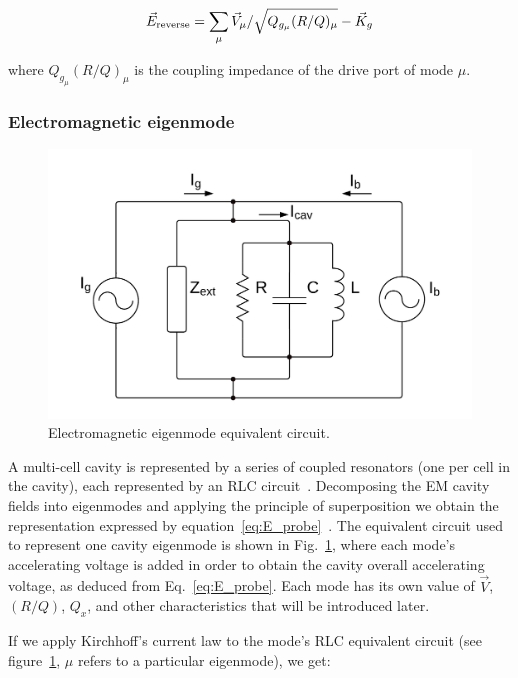 \documentclass[a4paper,12pt]{article}
\begin{document}
\begin{equation}
  \vec E_{\rm reverse}=\sum_\mu \vec V_\mu / \sqrt{Q_{g_{\mu}}(R/Q)_\mu} - \vec K_g
  \label{eq:E_reverse}
\end{equation}

\noindent where $Q_{g_{\mu}}(R/Q)_\mu$ is the coupling impedance of the drive port of mode $\mu$.

\subsubsection{Electromagnetic eigenmode}

\begin{figure}
\centering
\includegraphics[scale=0.20]{../figures/cavity_eq_circuit.png}
\caption{Electromagnetic eigenmode equivalent circuit.}
\label{fig:cav_eq_circuit}
\end{figure}

A multi-cell cavity is represented by a series of coupled resonators (one per cell in the cavity), each represented by an RLC circuit~\cite{ref:montgomery}. Decomposing the EM cavity fields into eigenmodes and applying the principle of superposition we obtain the representation expressed by equation~\ref{eq:E_probe}~\cite{ref:cell_modes}. The equivalent circuit used to represent one cavity eigenmode is shown in Fig.~\ref{fig:cav_eq_circuit}, where each mode's accelerating voltage is added in order to obtain the cavity overall accelerating voltage, as deduced from Eq.~\ref{eq:E_probe}. Each mode has its own value of $\vec V$, $(R/Q)$, $Q_x$, and other characteristics that will be introduced later.

If we apply Kirchhoff's current law to the mode's RLC equivalent circuit (see figure~\ref{fig:cav_eq_circuit}, $\mu$ refers to a particular eigenmode), we get:
\end{document}
